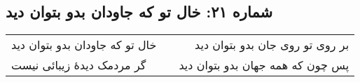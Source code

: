 \begin{center}
\section*{شماره ۲۱: خال تو که جاودان بدو بتوان دید}
\label{sec:021}
\begin{longtable}{l p{0.5cm} r}
خال تو که جاودان بدو بتوان دید
&&
بر روی تو روی جان بدو بتوان دید
\\
گر مردمک دیدهٔ زیبائی نیست
&&
پس چون که همه جهان بدو بتوان دید
\\
\end{longtable}
\end{center}
